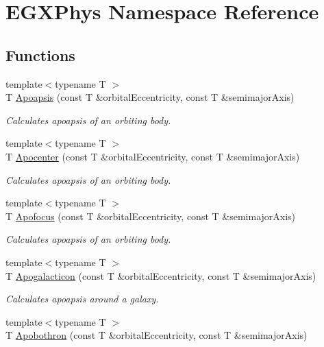 \hypertarget{namespace_e_g_x_phys}{}\section{E\+G\+X\+Phys Namespace Reference}
\label{namespace_e_g_x_phys}
\subsection*{Functions}
\begin{DoxyCompactItemize}
\item 
{\footnotesize template$<$typename T $>$ }\\T \hyperlink{group___apoapsis_gaf962e650bf84a568458e8eb39b1c61ba}{Apoapsis} (const T \&orbital\+Eccentricity, const T \&semimajor\+Axis)
\begin{DoxyCompactList}\small\item\em Calculates apoapsis of an orbiting body. \end{DoxyCompactList}\item 
{\footnotesize template$<$typename T $>$ }\\T \hyperlink{group___apoapsis_ga5e51a53e2f974264bada34f159fdc948}{Apocenter} (const T \&orbital\+Eccentricity, const T \&semimajor\+Axis)
\begin{DoxyCompactList}\small\item\em Calculates apoapsis of an orbiting body. \end{DoxyCompactList}\item 
{\footnotesize template$<$typename T $>$ }\\T \hyperlink{group___apoapsis_gaa53ac4e15bc6bc0fecf72eadb7a513e0}{Apofocus} (const T \&orbital\+Eccentricity, const T \&semimajor\+Axis)
\begin{DoxyCompactList}\small\item\em Calculates apoapsis of an orbiting body. \end{DoxyCompactList}\item 
{\footnotesize template$<$typename T $>$ }\\T \hyperlink{group___apoapsis_ga09b4c7d5e971dc28e1ba37f479958c27}{Apogalacticon} (const T \&orbital\+Eccentricity, const T \&semimajor\+Axis)
\begin{DoxyCompactList}\small\item\em Calculates apoapsis around a galaxy. \end{DoxyCompactList}\item 
{\footnotesize template$<$typename T $>$ }\\T \hyperlink{group___apoapsis_ga6fe084b9e69f47a5032b05aa8f6bf7ad}{Apobothron} (const T \&orbital\+Eccentricity, const T \&semimajor\+Axis)

\end{DoxyCompactItemize}
